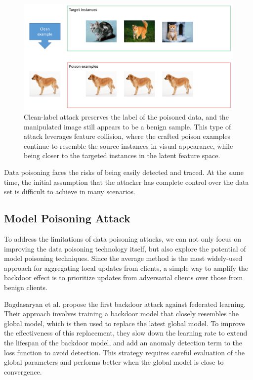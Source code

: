 \documentclass[conference]{IEEEtran}
\begin{document}
\begin{figure}[htbp]
    \centerline{\includegraphics[width=0.8\linewidth,height=0.6\linewidth]{picture/f7.png}}
    \caption{Clean-label attack preserves the label of the poisoned data,
    and the manipulated image still appears to be a benign sample. This type of attack
    leverages feature collision, where the crafted poison examples continue to
    resemble the source instances in visual appearance, while being closer to the
    targeted instances in the latent feature space.}
    \label{fig7}
\end{figure}

Data poisoning faces the risks of being easily detected and traced. 
At the same time, the initial assumption that the attacker has complete control over the data set is difficult to achieve in many scenarios.


\subsection{Model Poisoning Attack}
To address the limitations of data poisoning attacks, we can not only focus on
improving the data poisoning technology itself, but also explore the potential
of model poisoning techniques. Since the average method is the most widely-used
approach for aggregating local updates from clients, a simple way to amplify
the backdoor effect is to prioritize updates from adversarial clients over
those from benign clients.

Bagdasaryan et al.\cite{b241} propose the first backdoor attack against federated learning.
Their approach involves training a backdoor model that closely resembles the global
model, which is then used to replace the latest global model.
To improve the effectiveness of this replacement, they slow down
the learning rate to extend the lifespan of the backdoor model, and add an
anomaly detection term to the loss function to avoid detection. This
strategy requires careful evaluation of the global parameters and performs
better when the global model is close to convergence.
\end{document}
